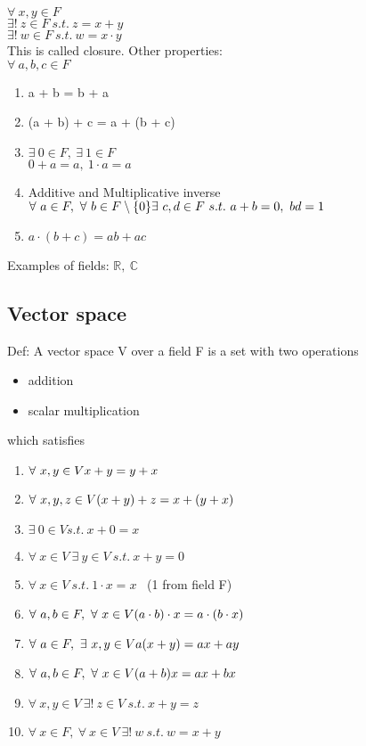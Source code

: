 \documentclass[a4paper]{article}
\begin{document}
\noindent $\forall\ x,y \in F$\\
\-\hspace{1in}$\exists !\ z \in F\ s.t.\ z = x + y$\\
\-\hspace{1in}$\exists !\ w \in F\ s.t.\ w = x \cdot y$\\ 
This is called closure.
\noindent Other properties:\\
$\forall\ a,b,c \in F$
\begin{enumerate}
	\item{a + b = b + a}
	\item{(a + b) + c = a + (b + c)}
	\item{$\exists \ 0 \in F,\ \exists \ 1 \in F$}\\
		$0 + a = a,\ 1 \cdot a = a$ 
	\item{Additive and Multiplicative inverse \\ $\forall \ a \in F,\ \forall \ b \in F \setminus \{0\} \\ \exists \ c,d \in F \ s.t. \ a + b = 0, \ bd = 1$}
	\item{$a \cdot (b + c) = ab + ac$}
\end{enumerate}

Examples of fields: $\mathbb{R},\ \mathbb{C}$

\subsection{Vector space}
Def: A vector space V over a field F is a set with two operations
\begin{itemize}
	\item{addition}
	\item {scalar multiplication}
\end{itemize}
which satisfies
\begin{enumerate}
	\item{$\forall \ x,y \in V \\ x + y = y + x$}
	\item{$\forall \ x,y,z \in V \\ (x + y) + z = x + (y + x)$}
	\item{$\exists \ 0 \in V s.t. \ x + 0 = x $}
	\item{$\forall \ x \in V\ \exists \ y \in V\ s.t. \ x + y = 0$}
	\item{$\forall \ x \in V \ s.t. \ 1 \cdot x = x$ \ (1 from field F)}
	\item{$\forall \ a,b \in F, \  \forall \ x \in V \\ (a \cdot b) \cdot x = a \cdot ( b \cdot x)$}
	\item{$\forall \ a \in F, \ \exists \ x,y \in V \\ a(x + y) = ax + ay$}
	\item{$\forall \ a,b \in F, \ \forall \ x \in V \\ (a + b)x = ax + bx $}
	\item{$\forall \ x,y \in V\ \exists ! \ z \in V\ s.t. \ x + y = z$}
	\item{$\forall \ x \in F,\ \forall \ x \in V \ \exists ! \ w \ s.t. \ w = x + y$}
\end{enumerate}
\end{document}
